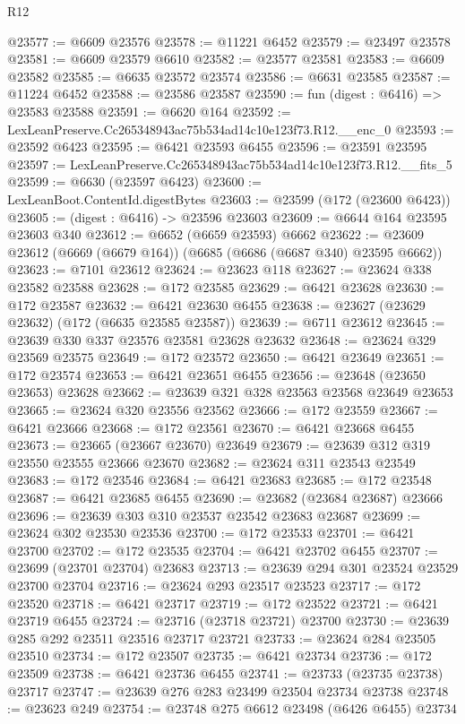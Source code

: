 \begin{lexlean}{R12}
\begin{coremodule}
@23577 := @6609 @23576
@23578 := @11221 @6452
@23579 := @23497 @23578
@23581 := @6609 @23579 @6610
@23582 := @23577 @23581
@23583 := @6609 @23582
@23585 := @6635 @23572 @23574
@23586 := @6631 @23585
@23587 := @11224 @6452
@23588 := @23586 @23587
@23590 := fun (digest : @6416) => @23583 @23588
@23591 := @6620 @164
@23592 := LexLeanPreserve.Cc265348943ac75b534ad14c10e123f73.R12.__enc_0
@23593 := @23592 @6423
@23595 := @6421 @23593 @6455
@23596 := @23591 @23595
@23597 := LexLeanPreserve.Cc265348943ac75b534ad14c10e123f73.R12.__fits_5
@23599 := @6630 (@23597 @6423)
@23600 := LexLeanBoot.ContentId.digestBytes
@23603 := @23599 (@172 (@23600 @6423))
@23605 := (digest : @6416) -> @23596 @23603
@23609 := @6644 @164 @23595 @23603 @340
@23612 := @6652 (@6659 @23593) @6662
@23622 := @23609 @23612 (@6669 (@6679 @164)) (@6685 (@6686 (@6687 @340) @23595 @6662))
@23623 := @7101 @23612
@23624 := @23623 @118
@23627 := @23624 @338 @23582 @23588
@23628 := @172 @23585
@23629 := @6421 @23628
@23630 := @172 @23587
@23632 := @6421 @23630 @6455
@23638 := @23627 (@23629 @23632) (@172 (@6635 @23585 @23587))
@23639 := @6711 @23612
@23645 := @23639 @330 @337 @23576 @23581 @23628 @23632
@23648 := @23624 @329 @23569 @23575
@23649 := @172 @23572
@23650 := @6421 @23649
@23651 := @172 @23574
@23653 := @6421 @23651 @6455
@23656 := @23648 (@23650 @23653) @23628
@23662 := @23639 @321 @328 @23563 @23568 @23649 @23653
@23665 := @23624 @320 @23556 @23562
@23666 := @172 @23559
@23667 := @6421 @23666
@23668 := @172 @23561
@23670 := @6421 @23668 @6455
@23673 := @23665 (@23667 @23670) @23649
@23679 := @23639 @312 @319 @23550 @23555 @23666 @23670
@23682 := @23624 @311 @23543 @23549
@23683 := @172 @23546
@23684 := @6421 @23683
@23685 := @172 @23548
@23687 := @6421 @23685 @6455
@23690 := @23682 (@23684 @23687) @23666
@23696 := @23639 @303 @310 @23537 @23542 @23683 @23687
@23699 := @23624 @302 @23530 @23536
@23700 := @172 @23533
@23701 := @6421 @23700
@23702 := @172 @23535
@23704 := @6421 @23702 @6455
@23707 := @23699 (@23701 @23704) @23683
@23713 := @23639 @294 @301 @23524 @23529 @23700 @23704
@23716 := @23624 @293 @23517 @23523
@23717 := @172 @23520
@23718 := @6421 @23717
@23719 := @172 @23522
@23721 := @6421 @23719 @6455
@23724 := @23716 (@23718 @23721) @23700
@23730 := @23639 @285 @292 @23511 @23516 @23717 @23721
@23733 := @23624 @284 @23505 @23510
@23734 := @172 @23507
@23735 := @6421 @23734
@23736 := @172 @23509
@23738 := @6421 @23736 @6455
@23741 := @23733 (@23735 @23738) @23717
@23747 := @23639 @276 @283 @23499 @23504 @23734 @23738
@23748 := @23623 @249
@23754 := @23748 @275 @6612 @23498 (@6426 @6455) @23734

\end{coremodule}
\end{lexlean}
